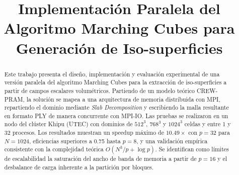 \documentclass[conference]{IEEEtran}
\begin{document}
\title{Implementación Paralela del Algoritmo Marching Cubes para Generación de Iso-superficies}

\author{
\and
{}
\and
{}
}

\maketitle

\begin{abstract}
Este trabajo presenta el diseño, implementación y evaluación experimental de una versión paralela del algoritmo Marching Cubes para la extracción de iso-superficies a partir de campos escalares volumétricos. Partiendo de un modelo teórico CREW-PRAM, la solución se mapea a una arquitectura de memoria distribuida con MPI, repartiendo el dominio mediante \textit{Slab Decomposition} y escribiendo la malla resultante en formato PLY de manera concurrente con MPI-IO. Las pruebas se realizaron en un nodo del clúster Khipu (UTEC) con dominios de $512^3$, $768^3$ y $1024^3$ celdas y entre 1 y 32 procesos. Los resultados muestran un speedup máximo de $10.49\times$ con $p=32$ para $N=1024$, eficiencias superiores a 0.75 hasta $p=8$, y una validación empírica consistente con la complejidad teórica $O(N^3/p + \log p)$. Se identifican como límites de escalabilidad la saturación del ancho de banda de memoria a partir de $p=16$ y el desbalance de carga inherente a la partición por bloques.
\end{abstract}
\end{document}
